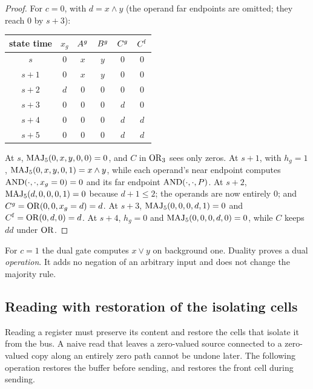 \begin{proof}
For $c=0$, with $d=x\wedge y$ (the operand far endpoints are omitted; they reach $0$ by $s+3$):
\begin{center}\small
\begin{tabular}{cccccc}\toprule
state time & $x_g$ & $A^{g}$ & $B^{g}$ & $C^{g}$ & $C^{\mathrm f}$\\\midrule
$s$   & $0$ & $x$ & $y$ & $0$ & $0$\\
$s+1$ & $0$ & $x$ & $y$ & $0$ & $0$\\
$s+2$ & $d$ & $0$ & $0$ & $0$ & $0$\\
$s+3$ & $0$ & $0$ & $0$ & $d$ & $0$\\
$s+4$ & $0$ & $0$ & $0$ & $d$ & $d$\\
$s+5$ & $0$ & $0$ & $0$ & $d$ & $d$\\\bottomrule
\end{tabular}
\end{center}
At $s$, $\operatorname{MAJ}_5(0,x,y,0,0)=0$, and $C$ in $\operatorname{OR}_3$ sees only zeros. At $s+1$, with $h_g=1$,
$\operatorname{MAJ}_5(0,x,y,0,1)=x\wedge y$, while each operand's near endpoint computes $\operatorname{AND}(\cdot,\cdot,x_g=0)=0$
and its far endpoint $\operatorname{AND}(\cdot,\cdot,P)$. At $s+2$, $\operatorname{MAJ}_5(d,0,0,0,1)=0$ because $d+1\le 2$; the
operands are now entirely $0$; and $C^{g}=\operatorname{OR}(0,0,x_g=d)=d$. At $s+3$, $\operatorname{MAJ}_5(0,0,0,d,1)=0$ and
$C^{\mathrm f}=\operatorname{OR}(0,d,0)=d$. At $s+4$, $h_g=0$ and $\operatorname{MAJ}_5(0,0,0,d,0)=0$, while $C$ keeps $dd$
under $\operatorname{OR}$.
\end{proof}

For $c=1$ the dual gate computes $x\vee y$ on background one. Duality proves a dual
\emph{operation}. It adds no negation of an arbitrary input and does not change the majority rule.

\subsection{Reading with restoration of the isolating cells}

Reading a register must preserve its content and restore the cells that isolate it from the bus. A
naive read that leaves a zero-valued source connected to a zero-valued copy along an entirely zero
path cannot be undone later. The following operation restores the buffer before sending, and
restores the front cell during sending.

